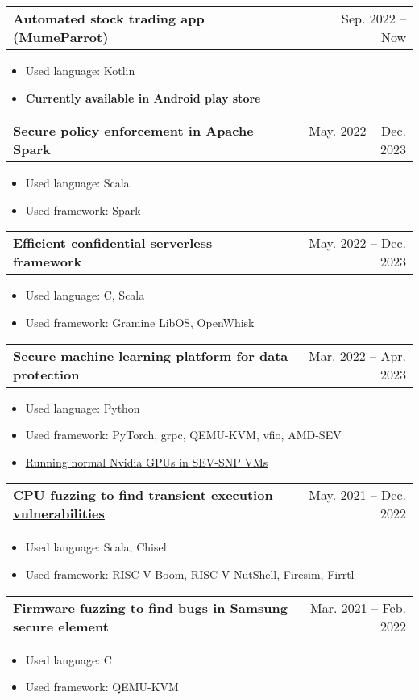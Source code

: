 \documentclass[letterpaper,11pt]{article}
\makeatletter
\newcommand{\resumeItem}[1]{
  \item\small{
    {#1 \vspace{-2pt}}
  }
}
\newcommand{\resumeProjectHeading}[2]{
    \item
    \begin{tabular*}{0.97\textwidth}[t]{l@{\extracolsep{\fill}}r}
      \textbf{#1} & #2
    \end{tabular*}\vspace{-7pt}
}
\newcommand{\resumeItemListStart}{\begin{itemize}}
\newcommand{\resumeItemListEnd}{\end{itemize}\vspace{-5pt}}
\makeatother
\begin{document}
      \resumeProjectHeading
          {\textbf{Automated stock trading app (MumeParrot)}}
          {Sep. 2022 -- Now}

        \resumeItemListStart
            \resumeItem
                {Used language: Kotlin}
            \resumeItem
                {\textbf{Currently available in Android play store}}
        \resumeItemListEnd

      \resumeProjectHeading
          {\textbf{Secure policy enforcement in Apache Spark}}
          {May. 2022 -- Dec. 2023}

        \resumeItemListStart
            \resumeItem
                {Used language: Scala}
            \resumeItem
                {Used framework: Spark}
        \resumeItemListEnd

      \resumeProjectHeading
          {\textbf{Efficient confidential serverless framework}}
          {May. 2022 -- Dec. 2023}

        \resumeItemListStart
            \resumeItem
                {Used language: C, Scala}
            \resumeItem
                {Used framework: Gramine LibOS, OpenWhisk}
        \resumeItemListEnd

      \resumeProjectHeading
          {\textbf{Secure machine learning platform for data protection}}
          {Mar. 2022 -- Apr. 2023}

        \resumeItemListStart
            \resumeItem
                {Used language: Python}
            \resumeItem
                {Used framework: PyTorch, grpc, QEMU-KVM, vfio, AMD-SEV}
            \resumeItem
                {\href{https://github.com/JaewonHur/sev-snp-gpu}{\underline{Running normal Nvidia GPUs in SEV-SNP VMs}}}
        \resumeItemListEnd

      \resumeProjectHeading
          {\href{https://github.com/compsec-snu/specdoctor}{\textbf{\underline{CPU fuzzing to find transient execution vulnerabilities}}}}
          {May. 2021 -- Dec. 2022}

        \resumeItemListStart
            \resumeItem
                {Used language: Scala, Chisel}
            \resumeItem
                {Used framework: RISC-V Boom, RISC-V NutShell, Firesim, Firrtl}
        \resumeItemListEnd

      \resumeProjectHeading
          {\textbf{Firmware fuzzing to find bugs in Samsung secure element}}
          {Mar. 2021 -- Feb. 2022}

        \resumeItemListStart
            \resumeItem
                {Used language: C}
            \resumeItem
                {Used framework: QEMU-KVM}
        \resumeItemListEnd
\end{document}
